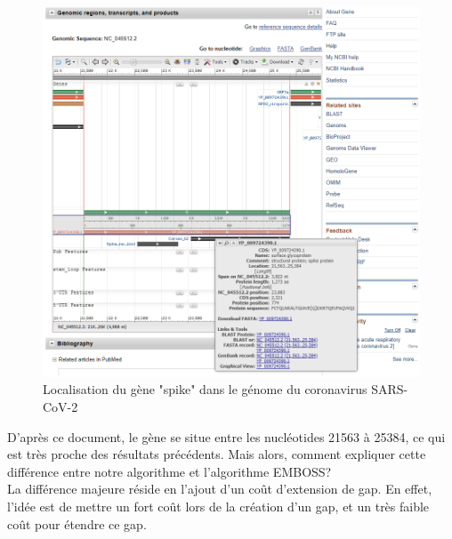 \documentclass[12pt]{article}
\begin{document}
\begin{figure}[!h]
    \centering
    \includegraphics[scale = 0.6]{Images/Needleman/real spike.png}
    \caption{Localisation du gène "spike" dans le génome du coronavirus SARS-CoV-2}
\end{figure}

D'après ce document, le gène se situe entre les nucléotides 21563 à 25384, ce qui est très proche des résultats précédents. Mais alors, comment expliquer cette différence entre notre algorithme et l'algorithme EMBOSS?\\

La différence majeure réside en l'ajout d'un coût d'extension de gap. En effet, l'idée est de mettre un fort coût lors de la création d'un gap, et un très faible coût pour étendre ce gap.
\end{document}
